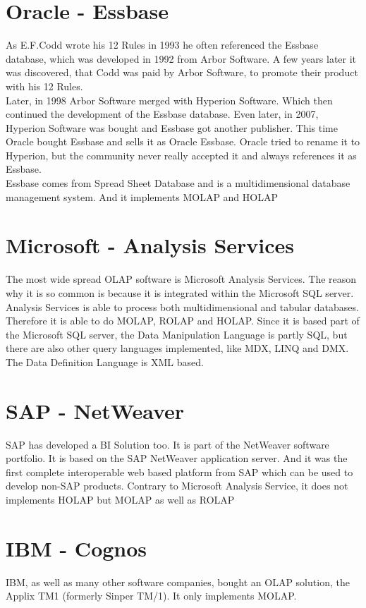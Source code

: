 \documentclass[12pt,a4paper,oneside,
liststotoc, 					%
bibtotoc,						%
titlepage, 						%
headsepline, 					%
BCOR6mm,						%
openany,							%
]{scrreprt}
\begin{document}
\section{Oracle - Essbase}\label{Oracle}
As E.F.Codd wrote his 12 Rules in 1993 he often referenced the Essbase database, which was developed in 1992 from Arbor Software. A few years later it was discovered, that Codd was paid by Arbor Software, to promote their product with his 12 Rules.\\
Later, in 1998 Arbor Software merged with Hyperion Software. Which then continued the development of the Essbase database. Even later, in 2007, Hyperion Software was bought and Essbase got another publisher. This time Oracle bought Essbase and sells it as Oracle Essbase. Oracle tried to rename it to Hyperion, but the community never really accepted it and always references it as Essbase.\\
Essbase comes from Spread Sheet Database and is a multidimensional database management system. And it implements MOLAP and HOLAP
\section{Microsoft - Analysis Services}\label{microsoft}
The most wide spread OLAP software is Microsoft Analysis Services. The reason why it is so common is because it is integrated within the Microsoft SQL server. Analysis Services is able to process both multidimensional and tabular databases. Therefore it is able to do MOLAP, ROLAP and HOLAP. Since it is based part of the Microsoft SQL server, the Data Manipulation Language is partly SQL, but there are also other query languages implemented, like MDX, LINQ and DMX. The Data Definition Language is XML based.
\section{SAP - NetWeaver}\label{SAP}
SAP has developed a BI Solution too. It is part of the NetWeaver software portfolio. It is based on the SAP NetWeaver application server. And it was the first complete interoperable web based platform from SAP which can be used to develop non-SAP products. Contrary to Microsoft Analysis Service, it does not implements HOLAP but MOLAP as well as ROLAP
\section{IBM - Cognos}\label{IBM}
IBM, as well as many other software companies, bought an OLAP solution, the Applix TM1 (formerly Sinper TM/1). It only implements MOLAP.
\end{document}

